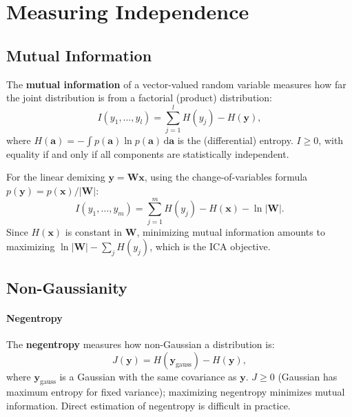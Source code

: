 \documentclass[11pt, oneside]{book}
\newcommand{\dd}{\,\mathrm{d}}
\begin{document}
\section{Measuring Independence}

\subsection{Mutual Information}

The \textbf{mutual information} of a vector-valued random variable measures how far the
joint distribution is from a factorial (product) distribution:
\[
  I(y_1,\ldots,y_l) = \sum_{j=1}^l H(y_j) - H(\bm{y}),
\]
where $H(\bm{a}) = -\int p(\bm{a})\ln p(\bm{a})\dd\bm{a}$ is the (differential) entropy.
$I \geq 0$, with equality if and only if all components are statistically independent.

For the linear demixing $\bm{y} = \bm{W}\bm{x}$, using the change-of-variables formula
$p(\bm{y}) = p(\bm{x})/|\bm{W}|$:
\[
  I(y_1,\ldots,y_m) = \sum_{j=1}^m H(y_j) - H(\bm{x}) - \ln|\bm{W}|.
\]
Since $H(\bm{x})$ is constant in $\bm{W}$, minimizing mutual information amounts to
maximizing $\ln|\bm{W}| - \sum_j H(y_j)$, which is the ICA objective.

\subsection{Non-Gaussianity}

\paragraph{Negentropy}
The \textbf{negentropy} measures how non-Gaussian a distribution is:
\[
  J(\bm{y}) = H(\bm{y}_{\mathrm{gauss}}) - H(\bm{y}),
\]
where $\bm{y}_{\mathrm{gauss}}$ is a Gaussian with the same covariance as $\bm{y}$.
$J \geq 0$ (Gaussian has maximum entropy for fixed variance); maximizing negentropy
minimizes mutual information.
Direct estimation of negentropy is difficult in practice.
\end{document}
